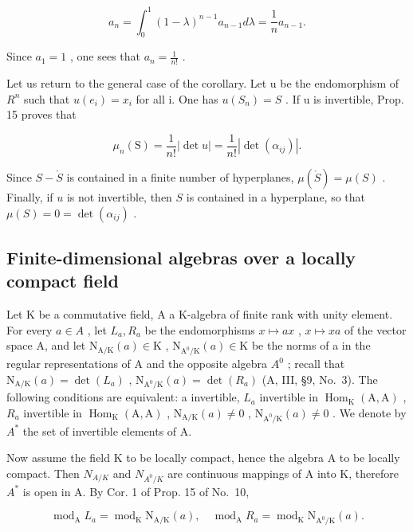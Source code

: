 \[
a _ {n} = \int_ {0} ^ {1} (1 - \lambda) ^ {n - 1} a _ {n - 1} d \lambda = \frac {1}{n} a _ {n - 1}.
\]

Since \(a_1 = 1\) , one sees that \(a_n = \frac{1}{n!}\) .

Let us return to the general case of the corollary. Let u be the endomorphism of \(R^{n}\) such that \(u(e_{i}) = x_{i}\) for all i. One has \(u(S_{n}) = S\) . If u is invertible, Prop. 15 proves that

\[
\mu_ {n} (\mathrm{S}) = \frac {1}{n !} | \det u | = \frac {1}{n !} | \det (\alpha_ {i j}) |.
\]

Since \(S - \mathring{S}\) is contained in a finite number of hyperplanes, \(\mu(\mathring{S}) = \mu(S)\) . Finally, if \(u\) is not invertible, then \(S\) is contained in a hyperplane, so that \(\mu(S) = 0 = \det(\alpha_{ij})\) .

\subsection{Finite-dimensional algebras over a locally compact field}

Let K be a commutative field, A a K-algebra of finite rank with unity element. For every \(a \in A\) , let \(L_{a}, R_{a}\) be the endomorphisms \(x \mapsto ax\) , \(x \mapsto xa\) of the vector space A, and let \(\mathrm{N}_{\mathrm{A}/\mathrm{K}}(a) \in \mathrm{K}\) , \(\mathrm{N}_{\mathrm{A}^{0}/\mathrm{K}}(a) \in \mathrm{K}\) be the norms of a in the regular representations of A and the opposite algebra \(A^{0}\) ; recall that \(\mathrm{N}_{\mathrm{A}/\mathrm{K}}(a) = \det(L_{a})\) , \(\mathrm{N}_{\mathrm{A}^{0}/\mathrm{K}}(a) = \det(R_{a})\) (A, III, §9, No.~3). The following conditions are equivalent: a invertible, \(L_{a}\) invertible in \(\operatorname{Hom}_{\mathrm{K}}(\mathrm{A}, \mathrm{A})\) , \(R_{a}\) invertible in \(\operatorname{Hom}_{\mathrm{K}}(\mathrm{A}, \mathrm{A})\) , \(\mathrm{N}_{\mathrm{A}/\mathrm{K}}(a) \neq 0\) , \(\mathrm{N}_{\mathrm{A}^{0}/\mathrm{K}}(a) \neq 0\) . We denote by \(A^{*}\) the set of invertible elements of A.

Now assume the field K to be locally compact, hence the algebra A to be locally compact. Then \(N_{A/K}\) and \(N_{A^{0}/K}\) are continuous mappings of A into K, therefore \(A^{*}\) is open in A. By Cor. 1 of Prop. 15 of No.~10,

\[
\operatorname{mod} _ {\mathrm{A}} L _ {a} = \operatorname{mod} _ {\mathrm{K}} \mathrm{N} _ {\mathrm{A} / \mathrm{K}} (a), \quad \operatorname{mod} _ {\mathrm{A}} R _ {a} = \operatorname{mod} _ {\mathrm{K}} \mathrm{N} _ {\mathrm{A} ^ {0} / \mathrm{K}} (a).\tag{38}
\]

